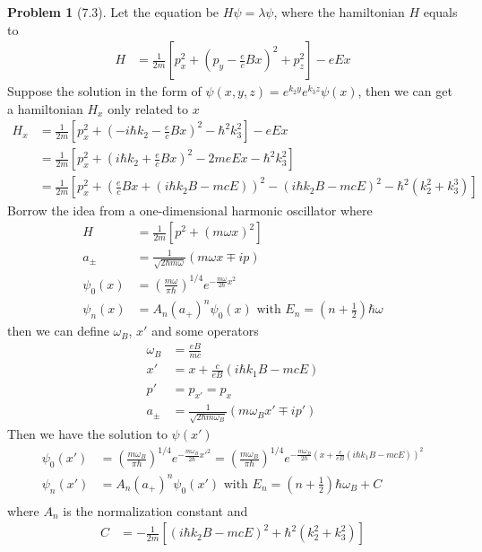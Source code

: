 \documentclass[twoside,11pt]{article}
\theoremstyle{definition}
\newtheorem{problem}{Problem}
\theoremstyle{remark}
\begin{document}
\begin{problem}[7.3]
Let the equation be $H\psi = \lambda\psi$, where the hamiltonian $H$ equals to
\begin{align*}
    H &= \frac{1}{2m} \left[p_x^2 + \left(p_y - \frac{e}{c}Bx\right)^2 + p_z^2
    \right] - eEx
\end{align*}
Suppose the solution in the form of $\psi(x, y, z) = e^{k_2y}e^{k_3z}\psi(x)$, then we can get
a hamiltonian $H_x$ only related to $x$
\begin{align*}
    H_x &=
    \frac{1}{2m}\left[
    p_x^2 + \left(-i\hbar k_2 - \frac{e}{c}Bx\right)^2 - \hbar^2k_3^2
    \right] - eEx\\
    &= \frac{1}{2m}\left[
    p_x^2 + \left(i\hbar k_2 + \frac{e}{c}Bx\right)^2 - 2meEx - \hbar^2k_3^2
    \right]\\
    &= \frac{1}{2m}\left[
    p_x^2 + \left(\frac{e}{c}Bx + (i\hbar k_2B - mcE)\right)^2 - (i\hbar k_2B-mcE)^2
    -\hbar^2(k_2^2+k_3^3)
    \right]
\end{align*}
Borrow the idea from a one-dimensional harmonic oscillator where
\begin{align*}
    H &= \frac{1}{2m}[p^2 + (m\omega x)^2]\\
    a_\pm &= \frac{1}{\sqrt{2\hbar m\omega}}(m\omega x \mp ip)\\
    \psi_0(x) &= \left(\frac{m\omega}{\pi\hbar}\right)^{1/4}e^{-\frac{m\omega}{2\hbar}x^2}\\
    \psi_n(x) &= A_n(a_+)^n\psi_0(x) \text{ with } E_n = \left(n + \frac{1}{2}\right)\hbar\omega
\end{align*}
then we can define $\omega_B$, $x'$ and some operators
\begin{align*}
    \omega_B &=  \frac{eB}{mc}\\
    x' &= x + \frac{c}{eB}(i\hbar k_1B - mcE)\\
    p' &= p_{x'} = p_x\\
    a_\pm &= \frac{1}{\sqrt{2\hbar m\omega_B}}(m\omega_B x' \mp ip')
\end{align*}
Then we have the solution to $\psi(x')$
\begin{align*}
    \psi_0(x') &= \left(\frac{m\omega_B}{\pi\hbar}\right)^{1/4}e^{-\frac{m\omega_B}{2\hbar}x'^2}
    = \left(\frac{m\omega_B}{\pi\hbar}\right)^{1/4}e^{-\frac{m\omega_B}{2\hbar}(x+\frac{c}{eB}(i\hbar
    k_1 B - mcE))^2}\\
    \psi_n(x') &= A_n(a_+)^n\psi_0(x') \text{ with } E_n = \left(n + \frac{1}{2}\right)\hbar\omega_B + C\\
\end{align*}
where $A_n$ is the normalization constant and 
\begin{align*}
    C &= -\frac{1}{2m}\left[
    (i\hbar k_2B - mcE)^2 + \hbar^2(k_2^2 + k_3^2)
    \right]
\end{align*}





\end{problem}







\end{document}
